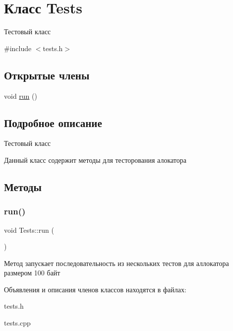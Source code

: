 \hypertarget{class_tests}{}\section{Класс Tests}
\label{class_tests}


Тестовый класс  




{\ttfamily \#include $<$tests.\+h$>$}

\subsection*{Открытые члены}
\begin{DoxyCompactItemize}
\item 
void \mbox{\hyperlink{class_tests_adfb4ef5de0e1170bbc918be484ff673b}{run}} ()
\end{DoxyCompactItemize}


\subsection{Подробное описание}
Тестовый класс 

Данный класс содержит методы для тесторования алокатора 

\subsection{Методы}
\mbox{\label{class_tests_adfb4ef5de0e1170bbc918be484ff673b}} 
\subsubsection{\texorpdfstring{run()}{run()}}
{\footnotesize\ttfamily void Tests\+::run (\begin{DoxyParamCaption}{ }\end{DoxyParamCaption})}

Метод запускает последовательность из нескольких тестов для аллокатора размером 100 байт 

Объявления и описания членов классов находятся в файлах\+:\begin{DoxyCompactItemize}
\item 
tests.\+h\item 
tests.\+cpp\end{DoxyCompactItemize}
